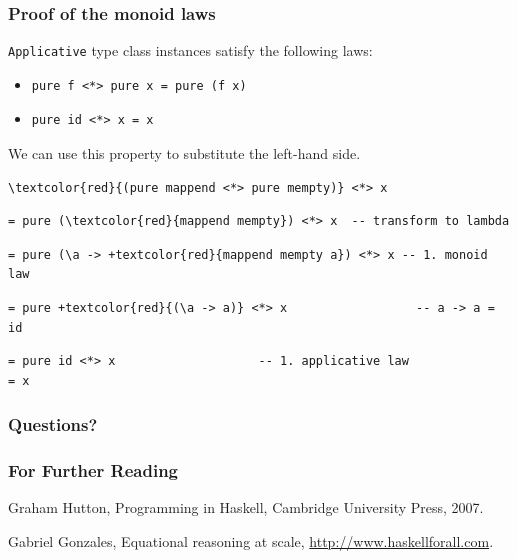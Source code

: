\documentclass{beamer}
\begin{document}
\begin{frame}[fragile]
  \frametitle{Proof of the monoid laws}
\verb|Applicative| type class instances satisfy the following laws:
\begin{itemize}
\item
\begin{Verbatim}
pure f <*> pure x = pure (f x)
\end{Verbatim}
\item
\begin{Verbatim}
pure id <*> x = x
\end{Verbatim}
\end{itemize}

We can use this property to substitute the left-hand side.
\begin{Verbatim}[commandchars=\\\{\}]
\textcolor{red}{(pure mappend <*> pure mempty)} <*> x   
\end{Verbatim}
\pause
\begin{Verbatim}[commandchars=\\\{\}]
= pure (\textcolor{red}{mappend mempty}) <*> x  -- transform to lambda
\end{Verbatim}
\pause
\begin{Verbatim}[commandchars=+\{\}]
= pure (\a -> +textcolor{red}{mappend mempty a}) <*> x -- 1. monoid law 
\end{Verbatim}
\pause
\begin{Verbatim}[commandchars=+\{\}]
= pure +textcolor{red}{(\a -> a)} <*> x                  -- a -> a = id
\end{Verbatim}
\pause
\begin{Verbatim}
= pure id <*> x                    -- 1. applicative law
= x
\end{Verbatim}

\end{frame}

\begin{frame}
  \frametitle{Questions?}
\end{frame}

\begin{frame}
  \frametitle{For Further Reading}

  \begin{thebibliography}{Subramaniam, 2011}

Graham Hutton,
Programming in Haskell,
Cambridge University Press,
2007.

Gabriel Gonzales,
Equational reasoning at scale, 
\url{http://www.haskellforall.com}.

\end{thebibliography}
\end{frame}
\end{document}
